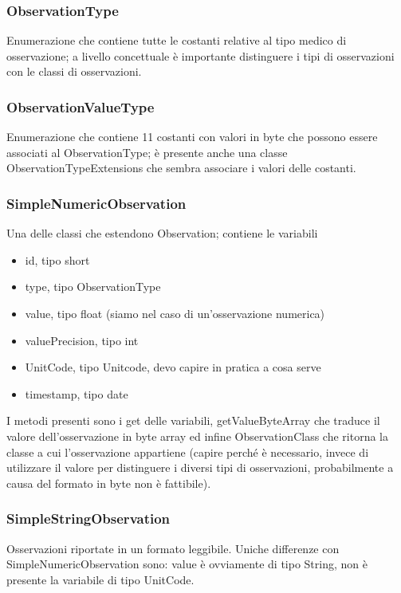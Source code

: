 \documentclass[a4paper]{article}
\begin{document}
        \subsubsection{ObservationType}
            Enumerazione che contiene tutte le costanti relative al tipo medico di osservazione; a livello concettuale è importante distinguere i tipi di osservazioni con le classi di osservazioni.
        \subsubsection{ObservationValueType}
            Enumerazione che contiene 11 costanti con valori in byte che possono essere associati al ObservationType; è presente anche una classe ObservationTypeExtensions
            che sembra associare i valori delle costanti.
        \subsubsection{SimpleNumericObservation}
            Una delle classi che estendono Observation; contiene le variabili 
            \begin{itemize}
                \item id, tipo short
                \item type, tipo ObservationType
                \item value, tipo float (siamo nel caso di un'osservazione numerica)
                \item valuePrecision, tipo int
                \item UnitCode, tipo Unitcode, devo capire in pratica a cosa serve
                \item timestamp, tipo date
            \end{itemize}
            I metodi presenti sono i get delle variabili, getValueByteArray che traduce il valore dell'osservazione in byte array ed infine
            ObservationClass che ritorna la classe a cui l'osservazione appartiene (capire perché è necessario, invece di utilizzare il valore per distinguere i diversi tipi
            di osservazioni, probabilmente a causa del formato in byte non è fattibile).
        \subsubsection{SimpleStringObservation}
            Osservazioni riportate in un formato leggibile.
            Uniche differenze con SimpleNumericObservation sono: value è ovviamente di tipo String, non è presente la variabile di tipo UnitCode.
\end{document}
